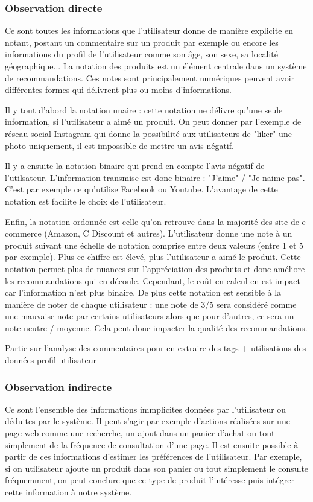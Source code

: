 \documentclass{report}
\begin{document}
\subsubsection{Observation directe}
Ce sont toutes les informations que l'utilisateur donne de manière explicite en notant, postant un commentaire sur un produit par exemple ou encore les informations du profil de l'utilisateur comme son âge, son sexe, sa localité géographique...
La notation des produits est un élément centrale dans un système de recommandations. Ces notes sont principalement numériques peuvent avoir différentes formes qui délivrent plus ou moins d'informations.
\vspace{0.5cm}
\par Il y tout d'abord la notation unaire : cette notation ne délivre qu'une seule information, si l'utilisateur a aimé un produit. On peut donner par l'exemple de réseau social Instagram qui donne la possibilité aux utilisateurs de "liker" une photo uniquement, il est impossible de mettre un avis négatif.
\par Il y a ensuite la notation binaire  qui prend en compte l'avis négatif de l'utilsateur. L'information transmise est donc binaire : "J'aime" / "Je naime pas". C'est par exemple ce qu'utilise Facebook ou Youtube. L'avantage de cette notation est facilite le choix de l'utilisateur.
\par Enfin, la notation ordonnée est celle qu'on retrouve dans la majorité des site de e-commerce (Amazon, C Discount et autres). L'utilisateur donne une note à un produit suivant une échelle de notation comprise entre deux valeurs (entre 1 et 5 par exemple). Plus ce chiffre est élevé, plus l'utilisateur a aimé le produit. Cette notation permet plus de nuances sur l'appréciation des produits et donc améliore les recommandations qui en découle.
Cependant, le coût en calcul en est impact car l'information n'est plus binaire. De plus cette notation est sensible à la manière de noter de chaque utilisateur : une note de 3/5 sera considéré comme une mauvaise note par certains utilisateurs alors que pour d'autres, ce sera un note neutre / moyenne. Cela peut donc impacter la qualité des recommandations.

\vspace{0.5cm}

Partie sur l'analyse des commentaires pour en extraire des tags + utilisations des données profil utilisateur
\subsubsection{Observation indirecte}
Ce sont l'ensemble des informations immplicites données par l'utilisateur ou déduites par le système. Il peut s'agir par exemple d'actions réalisées sur une page web comme une recherche, un ajout dans un panier d'achat ou tout simplement de la fréquence de consultation d'une page. Il est ensuite possible à partir de ces informations d'estimer les préférences de l'utilisateur. Par exemple, si on utilisateur ajoute un produit dans son panier ou tout simplement le consulte fréquemment, on peut conclure que ce type de produit l'intéresse puis intégrer cette information à notre système.
\end{document}
